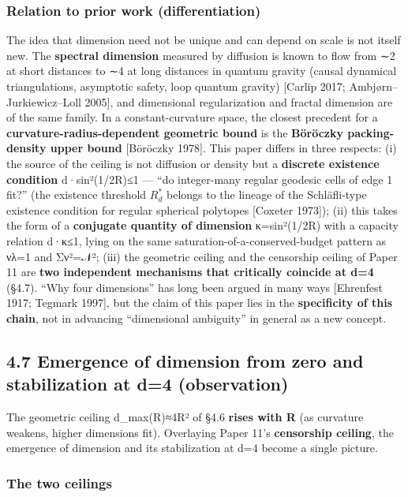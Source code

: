 \documentclass[
]{ltjsarticle}
\begin{document}
\subsubsection{Relation to prior work
(differentiation)}\label{relation-to-prior-work-differentiation}

The idea that dimension need not be unique and can depend on scale is
not itself new. The \textbf{spectral dimension} measured by diffusion is
known to flow from ∼2 at short distances to ∼4 at long distances in
quantum gravity (causal dynamical triangulations, asymptotic safety,
loop quantum gravity) {[}Carlip 2017; Ambjørn--Jurkiewicz--Loll 2005{]},
and dimensional regularization and fractal dimension are of the same
family. In a constant-curvature space, the closest precedent for a
\textbf{curvature-radius-dependent geometric bound} is the
\textbf{Böröczky packing-density upper bound} {[}Böröczky 1978{]}. This
paper differs in three respects: (i) the source of the ceiling is not
diffusion or density but a \textbf{discrete existence condition}
d·sin²(1/2R)≤1 --- ``do integer-many regular geodesic cells of edge 1
fit?'' (the existence threshold \(R^{*}_{d}\) belongs to the lineage of
the Schläfli-type existence condition for regular spherical polytopes
{[}Coxeter 1973{]}); (ii) this takes the form of a \textbf{conjugate
quantity of dimension} κ=sin²(1/2R) with a capacity relation d·κ≤1,
lying on the same saturation-of-a-conserved-budget pattern as νλ=1 and
Σν²=𝒩²; (iii) the geometric ceiling and the censorship ceiling of Paper
11 are \textbf{two independent mechanisms that critically coincide at
d=4} (§4.7). ``Why four dimensions'' has long been argued in many ways
{[}Ehrenfest 1917; Tegmark 1997{]}, but the claim of this paper lies in
the \textbf{specificity of this chain}, not in advancing ``dimensional
ambiguity'' in general as a new concept.

\subsection{4.7 Emergence of dimension from zero and stabilization at
d=4
(observation)}\label{emergence-of-dimension-from-zero-and-stabilization-at-d4-observation}

The geometric ceiling d\_max(R)≈4R² of §4.6 \textbf{rises with R} (as
curvature weakens, higher dimensions fit). Overlaying Paper 11's
\textbf{censorship ceiling}, the emergence of dimension and its
stabilization at d=4 become a single picture.

\subsubsection{The two ceilings}\label{the-two-ceilings}
\end{document}
